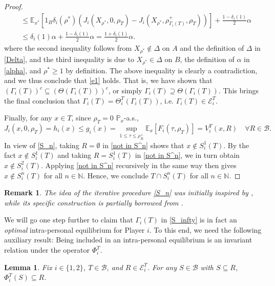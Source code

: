 \documentclass[11pt,reqno]{article}
\numberwithin{equation}{section}
\newtheorem{lemma}{Lemma}[section]
\newtheorem{remark}{Remark}[section]
\renewcommand{\P}{\mathbb{P}}
\newcommand{\E}{\mathbb{E}}
\newcommand{\cE}{\mathcal{E}}
\newcommand{\N}{\mathbb{N}}
\newcommand{\B}{\mathcal{B}}
\begin{document}
\begin{proof}
\begin{align*}
&\leq\E_{x^*}\left[1_B\delta_i(\rho^*)(J_i(X_{\rho^*},0,\rho_T)-J_i(X_{\rho^*},\rho^+_{\Gamma_i(T)},\rho_T))\right]+\frac{1-\delta_i(1)}{2}\alpha\\
&\leq\delta_i(1)\alpha+\frac{1-\delta_i(1)}{2}\alpha=\frac{1+\delta_i(1)}{2}\alpha. 
\end{align*}
where the second inequality follows from $X_{\rho^*}\notin \Delta$ on $A$ and the definition of $\Delta$ in \eqref{Delta}, and the third inequality is due to $X_{\rho^*}\in \Delta$ on $B$, the definition of $\alpha$ in \eqref{alpha}, and $\rho^*\ge 1$ by definition.  The above inequality is clearly a contradiction, and we thus conclude that \eqref{e1} holds. That is, we have shown that $(\Gamma_i(T))^c \subseteq (\Theta(\Gamma_i(T)))^c$, or simply $\Gamma_i(T) \supseteq \Theta(\Gamma_i(T))$. This brings the final conclusion that $\Gamma_i(T)=\Theta_i^T(\Gamma_i(T))$, i.e. $\Gamma_i(T)\in\cE_i^T$.

Finally, for any $x\in T$, since $\rho_T=0$ $\P_x$-a.s., 
\begin{equation}\label{not in S^n}
J_i(x,0,\rho_{T}) = h_i(x) \le g_i(x)=\sup_{1\le \tau\le \rho^+_{R}} \E_x[F_i(\tau,\rho_T)]  = V_i^{T}(x,R)\quad \forall R\in\B.
\end{equation}
In view of \eqref{S_n}, taking $R=\emptyset$ in \eqref{not in S^n} shows that $x\notin S_i^1(T)$. By the fact $x\notin S_i^1(T)$ and taking $R=S_i^1(T)$ in \eqref{not in S^n}, we in turn obtain $x\notin S_i^2(T)$. Applying \eqref{not in S^n} recursively in the same way then gives $x\notin S_i^n(T)$ for all $n\in\N$. Hence, we conclude $T\cap S_i^n(T)$ for all $n\in\N$. 
\end{proof}

\begin{remark}
The idea of the iterative procedure \eqref{S_n} was initially inspired by \cite[Section 3]{CL18}, while its specific construction is partially borrowed from \cite[Theorem 2.2]{https://doi.org/10.1111/mafi.12293}.
\end{remark}

We will go one step further to claim that $\Gamma_i(T)$ in \eqref{S_infty} is in fact an {\it optimal} intra-personal equilibrium for Player $i$. To this end, we need the following auxiliary result: Being included in an intra-personal equilibrium is an invariant relation under the operator $\Phi^T_i$.

\begin{lemma}\label{l4}
Fix $i\in\{1,2\}$, $T\in\B$, and $R\in\cE_i^T$. For any $S\in \B$ with $S\subseteq R$, $\Phi^T_i(S)\subseteq R$.
\end{lemma}
\end{document}
